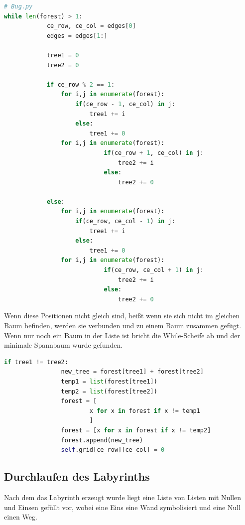 \documentclass[12pt, a4paper, titlepage]{article}
\begin{document}
\begin{lstlisting}[language = Python]
# Bug.py
while len(forest) > 1:
            ce_row, ce_col = edges[0]
            edges = edges[1:]
        
            tree1 = 0
            tree2 = 0
        
            if ce_row % 2 == 1:
                for i,j in enumerate(forest):
                    if(ce_row - 1, ce_col) in j:
                        tree1 += i
                    else:
                        tree1 += 0
                for i,j in enumerate(forest):
                            if(ce_row + 1, ce_col) in j:
                                tree2 += i
                            else:
                                tree2 += 0
                
            else:
                for i,j in enumerate(forest):
                    if(ce_row, ce_col - 1) in j:
                        tree1 += i
                    else:
                        tree1 += 0
                for i,j in enumerate(forest):
                            if(ce_row, ce_col + 1) in j:
                                tree2 += i
                            else:
                                tree2 += 0
\end{lstlisting}

Wenn diese Positionen nicht gleich sind, heißt wenn sie sich nicht im gleichen Baum befinden, werden sie verbunden und zu einem Baum zusammen gefügt.
Wenn nur noch ein Baum in der Liste ist bricht die While-Scheife ab und der minimale Spannbaum wurde gefunden.

\begin{lstlisting}[language = Python]
if tree1 != tree2:
                new_tree = forest[tree1] + forest[tree2]
                temp1 = list(forest[tree1])
                temp2 = list(forest[tree2])
                forest = [
                        x for x in forest if x != temp1
                        ]
                forest = [x for x in forest if x != temp2]
                forest.append(new_tree)
                self.grid[ce_row][ce_col] = 0
\end{lstlisting}

\subsection{Durchlaufen des Labyrinths}

Nach dem das Labyrinth erzeugt wurde liegt eine Liste von Listen mit Nullen und Einsen gefüllt vor, wobei eine Eins eine Wand symbolisiert und eine Null einen Weg.
\end{document}
